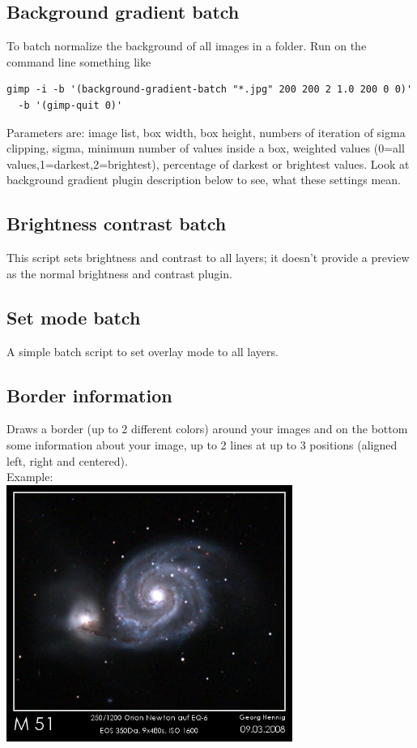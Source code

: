 \documentclass[a4paper]{article}
\begin{document}
\subsection{Background gradient batch}

To batch normalize the background of all images in a folder.
Run on the command line something like
\begin{verbatim}
gimp -i -b '(background-gradient-batch "*.jpg" 200 200 2 1.0 200 0 0)'
  -b '(gimp-quit 0)'
\end{verbatim}
Parameters are: image list, box width, box height, numbers of iteration of sigma clipping, sigma, minimum number of values inside a box, weighted values (0=all values,1=darkest,2=brightest), percentage of darkest or brightest values.
Look at background gradient plugin description below to see, what these settings mean.

\subsection{Brightness contrast batch}

This script sets brightness and contrast to all layers; it doesn't provide a preview as the normal brightness and contrast plugin.

\subsection{Set mode batch}

A simple batch script to set overlay mode to all layers.

\subsection{Border information}

Draws a border (up to 2 different colors) around your images and on the bottom some information about your image, up to 2 lines at up to 3 positions (aligned left, right and centered). \\
Example: \\
\includegraphics[width=0.7\textwidth]{border_information.jpg}
\end{document}
